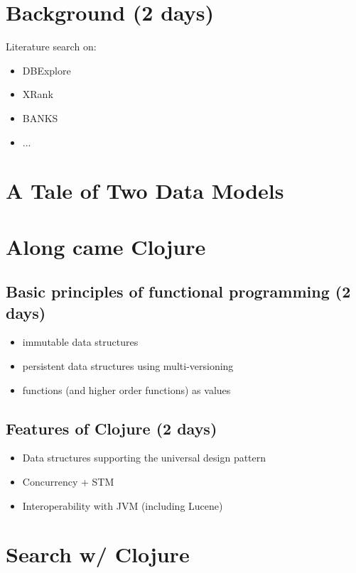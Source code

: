 \documentclass[12pt,letterpaper,oneside,notitlepage]{report}
\theoremstyle{definition}
\begin{document}
  \chapter{Background (2 days)}
    Literature search on:

    \begin{itemize}
      \item DBExplore
      \item XRank
      \item BANKS
      \item ...
    \end{itemize}
  
  \chapter{A Tale of Two Data Models}
    

  \chapter{Along came Clojure}
    \section{Basic principles of functional programming (2 days)}
      \begin{itemize}
        \item immutable data structures
        \item persistent data structures using multi-versioning
        \item functions (and higher order functions) as values
      \end{itemize}
    
    \section{Features of Clojure (2 days)}
      \begin{itemize}
        \item Data structures supporting the universal design pattern
        \item Concurrency + STM
        \item Interoperability with JVM (including Lucene)
      \end{itemize}

  \chapter{Search w/ Clojure}
\end{document}
